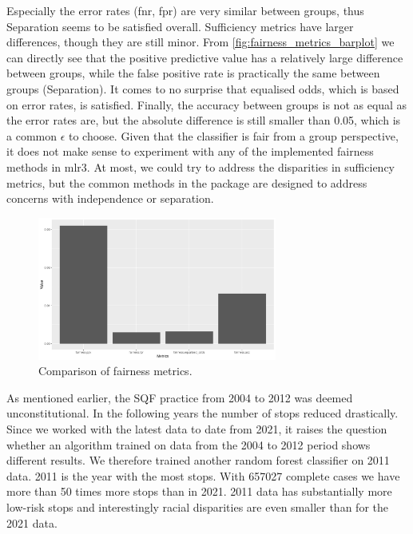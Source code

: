 Especially the error rates (fnr, fpr) are very similar between groups, thus Separation seems to be satisfied overall. Sufficiency metrics have larger differences, though they are still minor. From \autoref{fig:fairness_metrics_barplot} we can directly see that the positive predictive value has a relatively large difference between groups, while the false positive rate is practically the same between groups (Separation). It comes to no surprise that equalised odds, which is based on error rates, is satisfied. Finally, the accuracy between groups is not as equal as the error rates are, but the absolute difference is still smaller than 0.05, which is a common $\epsilon$ to choose.
Given that the classifier is fair from a group perspective, it does not make sense to experiment with any of the implemented fairness methods in mlr3. At most, we could try to address the disparities in sufficiency metrics, but the common methods in the package are designed to address concerns with independence or separation.
\begin{figure}
    \centering
    \includegraphics[width=0.7\textwidth]{../figures/sqf_case_study_plot2.png}
    \caption{Comparison of fairness metrics.}
    \label{fig:fairness_metrics_barplot}
\end{figure}

As mentioned earlier, the SQF practice from 2004 to 2012 was deemed unconstitutional. In the following years the number of stops reduced drastically. Since we worked with the latest data to date from 2021, it raises the question whether an algorithm trained on data from the 2004 to 2012 period shows different results.
We therefore trained another random forest classifier on 2011 data. 2011 is the year with the most stops. With 657027 complete cases we have more than 50 times more stops than in 2021.
2011 data has substantially more low-risk stops and interestingly racial disparities are even smaller than for the 2021 data.



